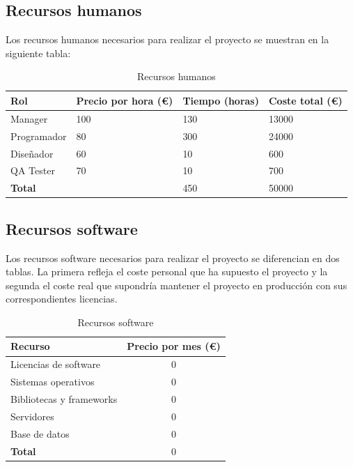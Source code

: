 \subsection{Recursos humanos}\label{subsec:recursos-humanos}

Los recursos humanos necesarios para realizar el proyecto se muestran en la siguiente tabla: \\

\begin{table}[h]
    \centering
    \begin{tabular}{|l|l|l|l|}
        \hline
        \textbf{Rol} & \textbf{Precio por hora (€)} & \textbf{Tiempo (horas)} & \textbf{Coste total (€)} \\ \hline
        Manager & 100 & 130 & 13000 \\ \hline
        Programador & 80 & 300 & 24000 \\ \hline
        Diseñador & 60 & 10 & 600 \\ \hline
        QA Tester & 70 & 10 & 700 \\ \hline
        \hline
        \textbf{Total} & & 450 & 50000 \\ \hline
    \end{tabular}
    \caption{Recursos humanos}
    \label{tab:tabla_recursos_humanos}
\end{table}

\subsection{Recursos software}\label{subsec:recursos-software}

Los recursos software necesarios para realizar el proyecto se diferencian en dos tablas. La primera refleja
el coste personal que ha supuesto el proyecto y la segunda el coste real que supondría mantener el proyecto
en producción con sus correspondientes licencias. \\

\begin{table}[h]
    \centering
    \begin{tabular}{|l|c|}
        \hline
        \textbf{Recurso} & \textbf{Precio por mes (€)} \\ \hline
        Licencias de software & 0 \\ \hline
        Sistemas operativos & 0 \\ \hline
        Bibliotecas y frameworks & 0 \\ \hline
        Servidores & 0 \\ \hline
        Base de datos & 0 \\ \hline
        \hline
        \textbf{Total} & 0 \\ \hline
    \end{tabular}
    \caption{Recursos software}
    \label{tab:tabla_recursos_software_propios}
\end{table}

